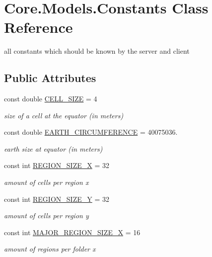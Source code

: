 \hypertarget{classCore_1_1Models_1_1Constants}{}\section{Core.\+Models.\+Constants Class Reference}
\label{classCore_1_1Models_1_1Constants}


all constants which should be known by the server and client  


\subsection*{Public Attributes}
\begin{DoxyCompactItemize}
\item 
const double \hyperlink{classCore_1_1Models_1_1Constants_adde91f87a25a57db171667f80b72d69f}{C\+E\+L\+L\+\_\+\+S\+I\+Z\+E} = 4
\begin{DoxyCompactList}\small\item\em size of a cell at the equator (in meters) \end{DoxyCompactList}\item 
const double \hyperlink{classCore_1_1Models_1_1Constants_ad31578c20b30dd96faf43b7a9f7b0389}{E\+A\+R\+T\+H\+\_\+\+C\+I\+R\+C\+U\+M\+F\+E\+R\+E\+N\+C\+E} = 40075036.
\begin{DoxyCompactList}\small\item\em earth size at equator (in meters) \end{DoxyCompactList}\item 
const int \hyperlink{classCore_1_1Models_1_1Constants_a2d02174b6a70404c1d8093c81eb47cb2}{R\+E\+G\+I\+O\+N\+\_\+\+S\+I\+Z\+E\+\_\+\+X} = 32
\begin{DoxyCompactList}\small\item\em amount of cells per region x \end{DoxyCompactList}\item 
const int \hyperlink{classCore_1_1Models_1_1Constants_ad7f91cdefc9377eb37c98a50e0d1c068}{R\+E\+G\+I\+O\+N\+\_\+\+S\+I\+Z\+E\+\_\+\+Y} = 32
\begin{DoxyCompactList}\small\item\em amount of cells per region y \end{DoxyCompactList}\item 
const int \hyperlink{classCore_1_1Models_1_1Constants_a26b3d6b0c7f17fdac4b0789c3a6adec6}{M\+A\+J\+O\+R\+\_\+\+R\+E\+G\+I\+O\+N\+\_\+\+S\+I\+Z\+E\+\_\+\+X} = 16
\begin{DoxyCompactList}\small\item\em amount of regions per folder x \end{DoxyCompactList}\item 

\end{DoxyCompactItemize}
